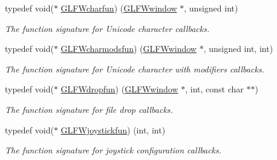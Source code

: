 \begin{DoxyCompactItemize}
typedef void($\ast$ \hyperlink{group__input_gabf24451c7ceb1952bc02b17a0d5c3e5f}{G\+L\+F\+Wcharfun}) (\hyperlink{group__window_ga3c96d80d363e67d13a41b5d1821f3242}{G\+L\+F\+Wwindow} $\ast$, unsigned int)
\begin{DoxyCompactList}\small\item\em The function signature for Unicode character callbacks. \end{DoxyCompactList}\item 
typedef void($\ast$ \hyperlink{group__input_gae36fb6897d2b7df9b128900c8ce9c507}{G\+L\+F\+Wcharmodsfun}) (\hyperlink{group__window_ga3c96d80d363e67d13a41b5d1821f3242}{G\+L\+F\+Wwindow} $\ast$, unsigned int, int)
\begin{DoxyCompactList}\small\item\em The function signature for Unicode character with modifiers callbacks. \end{DoxyCompactList}\item 
typedef void($\ast$ \hyperlink{group__input_gab71f4ca80b651462852e601caf308c4a}{G\+L\+F\+Wdropfun}) (\hyperlink{group__window_ga3c96d80d363e67d13a41b5d1821f3242}{G\+L\+F\+Wwindow} $\ast$, int, const char $\ast$$\ast$)
\begin{DoxyCompactList}\small\item\em The function signature for file drop callbacks. \end{DoxyCompactList}\item 
typedef void($\ast$ \hyperlink{group__input_gaa67aa597e974298c748bfe4fb17d406d}{G\+L\+F\+Wjoystickfun}) (int, int)
\begin{DoxyCompactList}\small\item\em The function signature for joystick configuration callbacks. \end{DoxyCompactList}\end{DoxyCompactItemize}
